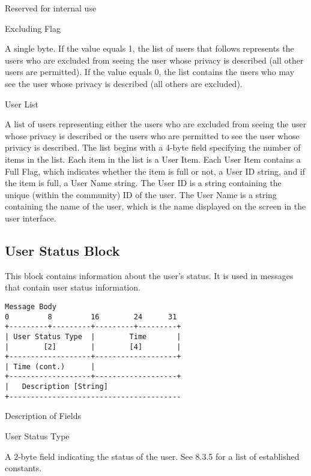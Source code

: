 \documentclass[titlepage,oneside]{book}
\begin{document}
\subpar{}   Reserved for internal use

\par{} Excluding Flag

\subpar{} A single byte. If the value equals 1, the list of users that follows
  represents the users who are excluded from seeing the user whose
  privacy is described (all other users are permitted).
  If the value equals 0, the list contains the users who may see the
  user whose privacy is described (all others are excluded).

\par{} User List

\subpar{}   A list of users representing either the users who are excluded from
  seeing the user whose privacy is described or the users who are
  permitted to see the user whose privacy is described. The list
  begins with a 4-byte field specifying the number of items in the
  list. Each item in the list is a User Item. Each User Item contains
  a Full Flag, which indicates whether the item is full or not, a User
  ID string, and if the item is full, a User Name string.
  The User ID is a string containing the unique (within the community)
  ID of the user. The User Name is a string containing the name of the
  user, which is the name displayed on the screen in the user
  interface.

\subsection{User Status Block}

\par{} This block contains information about the user's status. It is
used in messages that contain user status information.

\begin{verbatim}
Message Body
0         8         16        24      31
+---------+---------+---------+---------+
| User Status Type  |        Time       |
|        [2]        |        [4]        |
+-------------------+-------------------+
| Time (cont.)      |
+-------------------+-------------------+
|   Description [String]
+----------------------------------------
\end{verbatim}

\par{} Description of Fields

\par{} User Status Type

\subpar{}   A 2-byte field indicating the status of the user. See 
  8.3.5 for a list of established constants.
\end{document}
